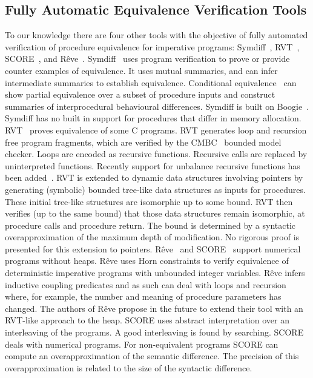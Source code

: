 \documentclass[runningheads,a4paper]{llncs}
\begin{document}
\subsection{Fully Automatic Equivalence Verification Tools}
To our knowledge there are four other tools with the objective of fully automated verification of procedure equivalence for imperative programs: Symdiff~\cite{Lahiri2012}, RVT~\cite{Godlin09}, SCORE~\cite{Partush2014}, and Rêve~\cite{Felsing2014}.
Symdiff~\cite{Lahiri2012} uses program verification to prove or provide counter examples of equivalence. It uses mutual summaries, and can infer intermediate summaries to establish equivalence. Conditional equivalence~\cite{Hawblitzel2013} can show partial equivalence over a subset of procedure inputs and construct summaries of interprocedural behavioural differences. Symdiff is built on Boogie~\cite{Barnett2005}. Symdiff has no built in support for procedures that differ in memory allocation.
RVT~\cite{Godlin09} proves equivalence of some C programs. RVT generates loop and recursion free program fragments, which are verified by the CMBC~\cite{Clarke2003} bounded model checker. Loops are encoded as recursive functions. Recursive calls are replaced by uninterpreted functions. Recently support for unbalance recursive functions has been added~\cite{Strichman2016}. RVT is extended to dynamic data structures involving pointers by generating (symbolic) bounded tree-like data structures as inputs for procedures. These initial tree-like structures are isomorphic up to some bound. RVT then verifies (up to the same bound) that those data structures remain isomorphic, at procedure calls and procedure return. The bound is determined by a syntactic overapproximation of the maximum depth of modification. No rigorous proof is presented for this extension to pointers.
R{\^e}ve~\cite{Felsing2014} and SCORE~\cite{Partush2014} support numerical programs without heaps. R{\^e}ve uses Horn constraints to verify equivalence of deterministic imperative programs with unbounded integer variables. R{\^e}ve infers inductive coupling predicates and as such can deal with loops and recursion where, for example, the number and meaning of procedure parameters has changed. The authors of R{\^e}ve propose in the future to extend their tool with an RVT-like approach to the heap. SCORE uses abstract interpretation over an interleaving of the programs. A good interleaving is found by searching. SCORE deals with numerical programs. For non-equivalent programs SCORE can compute an overapproximation of the semantic difference. The precision of this overapproximation is related to the size of the syntactic difference.
\end{document}
